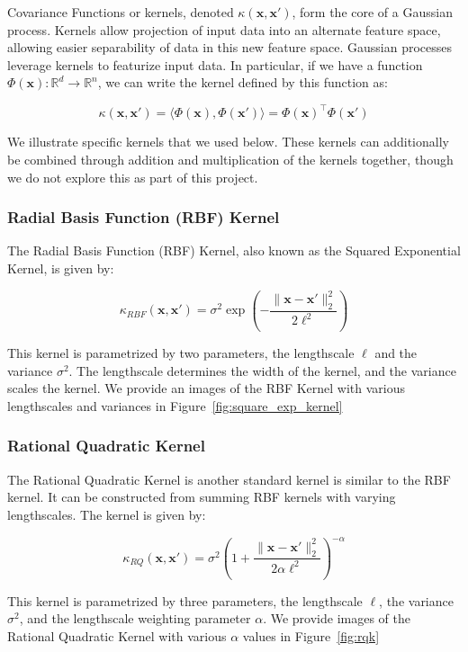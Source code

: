 \documentclass{article}
\newcommand{\R}{\mathbb{R}}
\newcommand{\bx}{\boldsymbol{x}}
\begin{document}
Covariance Functions or kernels, denoted $\kappa(\bx, \bx')$, form the core of a Gaussian process. Kernels allow
projection of input data into an alternate feature space, allowing easier separability of data in this new feature
space. Gaussian processes leverage kernels to featurize input data. In particular, if we have a function
$\Phi(\bx): \R^d \rightarrow \R^n$, we can write the kernel defined by this function as:

\[
  \kappa(\bx, \bx') = \langle \Phi(\bx), \Phi(\bx') \rangle = \Phi(\bx)^\top \Phi(\bx')
\]

We illustrate specific kernels that we used below. These kernels can additionally be combined through addition and
multiplication of the kernels together, though we do not explore this as part of this project.

\subsubsection{Radial Basis Function (RBF) Kernel}

The Radial Basis Function (RBF) Kernel, also known as the Squared Exponential Kernel, is given by:

\[
  \kappa_{RBF}(\bx, \bx') = \sigma^2 \exp\left( - \frac{\|\bx -\bx' \|_{2}^{2}}{2 \ell^2} \right)
\]

This kernel is parametrized by two parameters, the lengthscale $\ell$ and the variance $\sigma^2$. The lengthscale
determines the width of the kernel, and the variance scales the kernel\cite{duvenaud_automatic_2014}. We provide an
images of the RBF Kernel with various lengthscales and variances in Figure~\ref{fig:square_exp_kernel}

\subsubsection{Rational Quadratic Kernel}

The Rational Quadratic Kernel is another standard kernel is similar to the RBF kernel. It can be constructed from
summing RBF kernels with varying lengthscales. The kernel is given by:

\[
  \kappa_{RQ}(\bx, \bx') = \sigma^2 \left( 1 + \frac{\| \bx - \bx' \|_{2}^{2}}{2 \alpha \ell^2} \right)^{-\alpha}
\]

This kernel is parametrized by three parameters, the lengthscale $\ell$, the variance $\sigma^2$, and the lengthscale
weighting parameter $\alpha$\cite{duvenaud_automatic_2014}. We provide images of the Rational Quadratic Kernel with
various $\alpha$ values in Figure~\ref{fig:rqk}
\end{document}
